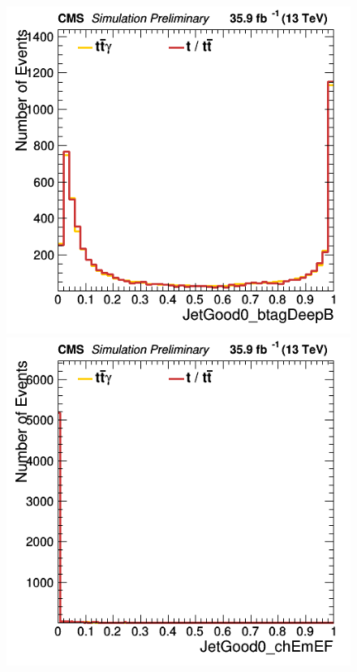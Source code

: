 \documentclass[11pt]{scrartcl}
\begin{document}
	\begin{figure}[H]
	\centering
	\begin{minipage}{.5\textwidth}
	  \centering
	  \includegraphics[width=0.75\linewidth]{figures/Notused/JetGood0_btagDeepB.png}
	\end{minipage}%
	\begin{minipage}{.5\textwidth}
	  \centering
	  \includegraphics[width=0.75\linewidth]{figures/Notused/JetGood0_chEmEF.png}
	\end{minipage}
	\end{figure}
	
\end{document}
